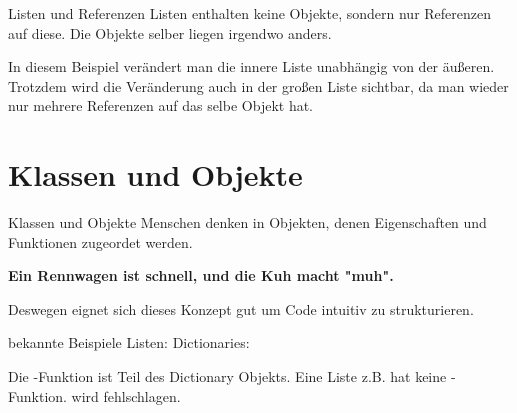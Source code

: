 \begin{frame}{Listen und Referenzen}
	Listen enthalten keine Objekte, sondern nur Referenzen auf diese. Die Objekte selber liegen irgendwo anders.
	
	In diesem Beispiel verändert man die innere Liste unabhängig von der äußeren. Trotzdem wird die Veränderung auch in der großen Liste sichtbar, da man wieder nur mehrere Referenzen auf das selbe Objekt hat.
\end{frame}

\section{Klassen und Objekte}
\begin{frame}{Klassen und Objekte}
	Menschen denken in Objekten, denen Eigenschaften und Funktionen zugeordet werden. \linebreak
	\begin{center}
		 \textbf{Ein Rennwagen ist schnell, und die Kuh macht "muh".} \linebreak
	\end{center}
	Deswegen eignet sich dieses Konzept gut um Code intuitiv zu strukturieren.
\end{frame}
\begin{frame}{bekannte Beispiele}
	Listen: 
	\linebreak
	Dictionaries: 
	\linebreak
	
	Die -Funktion ist Teil des Dictionary Objekts. Eine Liste z.B. hat keine -Funktion. 
	\linebreak\linebreak
	 wird fehlschlagen.	
\end{frame}


